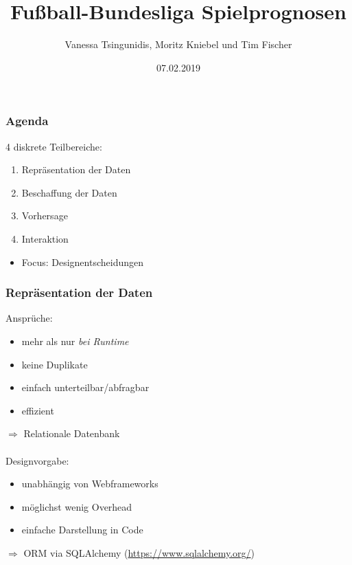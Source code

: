 \documentclass{beamer}
\title[DFB Predict]{Fußball-Bundesliga Spielprognosen}
\subtitle{Vanessa Tsingunidis, Moritz Kniebel und Tim Fischer}
\date{07.02.2019}
\begin{document}
    \setlength{\abovedisplayskip}{0pt}
    \setlength{\belowdisplayskip}{0pt}
    \setlength{\abovedisplayshortskip}{0pt}
    \setlength{\belowdisplayshortskip}{0pt}
    \begin{frame}
        \titlepage
    \end{frame}
    \begin{frame}
        \frametitle{Agenda}
        4 diskrete Teilbereiche:
        \begin{enumerate}
            \item Repräsentation der Daten
            \item Beschaffung der Daten
            \item Vorhersage
            \item Interaktion
        \end{enumerate}
        \begin{itemize}
            \item Focus: Designentscheidungen
        \end{itemize}
    \end{frame}
    \begin{frame}
        \frametitle{Repräsentation der Daten}
        Ansprüche:
        \begin{itemize}
            \item mehr als nur \textit{bei Runtime}
            \item keine Duplikate
            \item einfach unterteilbar/abfragbar
            \item effizient
        \end{itemize}
        $\Rightarrow$ Relationale Datenbank\\\\
        Designvorgabe:
        \begin{itemize}
            \item unabhängig von Webframeworks
            \item möglichst wenig Overhead
            \item einfache Darstellung in Code
        \end{itemize}
        $\Rightarrow$ ORM via SQLAlchemy (\url{https://www.sqlalchemy.org/})
    \end{frame}
\end{document}

